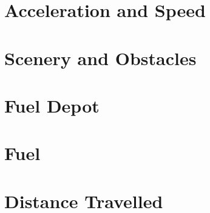 \documentclass{article}
\begin{document}
\clearpage

\section{Acceleration and Speed}

\clearpage

\section{Scenery and Obstacles}

\clearpage

\section{Fuel Depot}

\clearpage

\section{Fuel}

\clearpage


\section{Distance Travelled}

\clearpage


\end{document}
